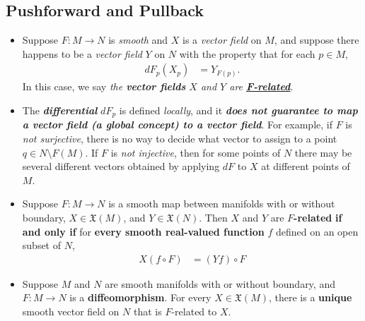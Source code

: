 \documentclass[11pt]{article}
\begin{document}
\subsection{Pushforward and Pullback}
\begin{itemize}
\item 
\begin{definition}
Suppose $F: M \rightarrow N$ is \emph{smooth} and $X$ is a \emph{vector field} on $M$,  and suppose there happens to be a \emph{vector field} $Y$ on $N$ with the property that for each $p \in M$,
\begin{align*}
dF_{p}(X_p) &= Y_{F(p)}.
\end{align*}
 In this case, we say \emph{the \textbf{vector fields} $X$ and $Y$ are \underline{\textbf{F-related}}}. 
\end{definition}

\item \begin{remark}
The \emph{\textbf{differential}} $dF_{p}$ is defined \emph{locally}, and it \emph{\textbf{does not guarantee to map a vector field (a global concept) to a vector field}}.  For example,
if $F$ is \emph{not surjective}, there is no way to decide what vector to assign to a point $q \in N \setminus F(M)$.  If $F$ is \emph{not injective}, then for some points of $N$ there may be several different vectors obtained by applying $dF$ to $X$ at different points of $M$.
\end{remark}

\item \begin{proposition}
Suppose $F: M \rightarrow N$ is a smooth map between manifolds with or without boundary, $X \in \mathfrak{X}(M)$, and $Y \in \mathfrak{X}(N)$. Then $X$ and $Y$ are \textbf{$F$-related} \textbf{if and only if} for \textbf{every smooth real-valued function} $f$ defined on an open subset of $N$,
\begin{align}
X(f \circ F) &= (Yf) \circ F \label{eqn: F_related_vector_fields_condition}
\end{align}
\end{proposition}

\item 
\begin{proposition}
Suppose $M$ and $N$ are smooth manifolds with or without boundary, and $F: M \rightarrow N$ is a \textbf{diffeomorphism}. For every $X \in \mathfrak{X}(M)$, there is a \textbf{unique} smooth vector field on $N$ that is $F$-related to $X$.
\end{proposition}


\end{itemize}
\end{document}
